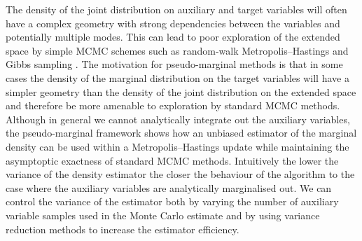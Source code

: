 The density of the joint distribution on auxiliary and target variables will often have a complex geometry with strong dependencies between the variables and potentially multiple modes. This can lead to poor exploration of the extended space by simple \ac{MCMC} schemes such as random-walk Metropolis--Hastings and Gibbs sampling \citep{andrieu2009pseudo}. The motivation for pseudo-marginal methods is that in some cases the density of the marginal distribution on the target variables will have a simpler geometry than the density of the joint distribution on the extended space and therefore be more amenable to exploration by standard \ac{MCMC} methods. Although in general we cannot analytically integrate out the auxiliary variables, the pseudo-marginal framework shows how an unbiased estimator of the marginal density can be used within a Metropolis--Hastings update while maintaining the asymptoptic exactness of standard \ac{MCMC} methods.  Intuitively the lower the variance of the density estimator the closer the behaviour of the algorithm to the case where the auxiliary variables are analytically marginalised out. We can control the variance of the estimator both by varying the number of auxiliary variable samples used in the Monte Carlo estimate and by using variance reduction methods to increase the estimator efficiency.



